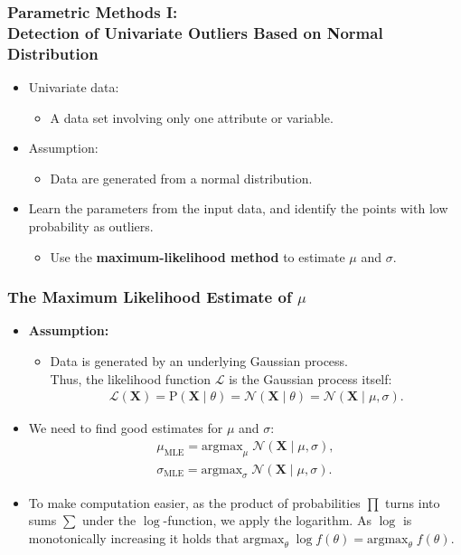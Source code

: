 \begin{frame}
  \frametitle{Parametric Methods I: \\ Detection of Univariate Outliers Based on Normal Distribution}
  \begin{itemize}
  \item Univariate data:
    \begin{itemize}
    \item A data set involving only one attribute or variable.
    \end{itemize}
  \item Assumption:
    \begin{itemize}
    \item Data are generated from a normal distribution.
    \end{itemize}
  \item Learn the parameters from the input data, and identify the points with low probability as outliers.
    \begin{itemize}
    \item Use the \textbf{\color{airforceblue}maximum-likelihood method} to estimate $\mu$ and $\sigma$.
    \end{itemize}
  \end{itemize}
\end{frame}


\begin{frame}
  \frametitle{The Maximum Likelihood Estimate of $\mu$}
  \begin{itemize}
  \item \textbf{Assumption:}
    \begin{itemize}
    \item Data is generated by an underlying Gaussian process. \\
      Thus, the likelihood function $\mathcal{L}$ is the Gaussian process itself:
      \begin{align}
        \mathcal{L}(\mathbf{X}) = \text{P}(\mathbf{X} \; \vert \; \theta) = \mathcal{N}(\mathbf{X} \; \vert \; \theta) = \mathcal{N}(\mathbf{X} \; \vert \; \mu, \sigma).
      \end{align}
    \end{itemize}
  \item We need to find good estimates for $\mu$ and $\sigma$:
    \begin{align}
      \mu_{\text{MLE}} = \text{argmax}_{\mu} \; \mathcal{N}(\mathbf{X} \; \vert \; \mu, \sigma),\\
      \sigma_{\text{MLE}} = \text{argmax}_{\sigma} \; \mathcal{N}(\mathbf{X} \; \vert \; \mu, \sigma).
    \end{align}
  \item To make computation easier, as the product of probabilities $\prod$ turns into sums $\sum$ under the $\log$-function, we apply the logarithm. As $\log$ is monotonically increasing it holds that $\text{argmax}_{\theta} \; \log f(\theta) = \text{argmax}_{\theta} \; f(\theta)$.
  \end{itemize}
\end{frame}


